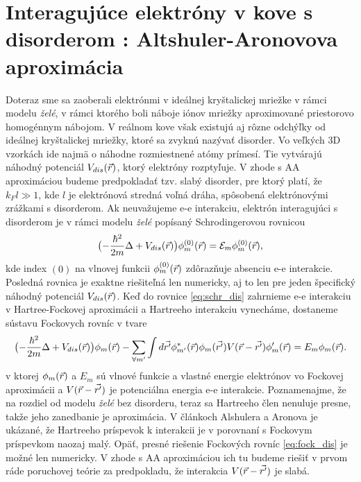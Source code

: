\section
{Interagujúce elektróny v kove s disorderom : Altshuler-Aronovova aproximácia}

 Doteraz sme sa zaoberali elektrónmi v ideálnej kryštalickej mriežke v rámci modelu {\it želé}, v rámci ktorého boli náboje iónov mriežky aproximované
 priestorovo homogénnym nábojom. V reálnom kove však existujú aj rôzne odchýľky od ideálnej kryštalickej mriežky, ktoré sa zvyknú nazývať disorder. Vo veľkých 3D vzorkách
 ide najmä o náhodne rozmiestnené atómy prímesí. Tie vytvárajú náhodný potenciál $V_{dis}(\vec{r})$, ktorý elektróny rozptyľuje. V zhode s AA aproximáciou budeme predpokladať tzv. slabý disorder, pre ktorý
 platí, že $k_F l \gg 1$, kde $l$ je elektrónová stredná voľná dráha, spôsobená elektrónovými zrážkami s disorderom.
Ak neuvažujeme e-e interakciu, elektrón interagujúci s disorderom je v rámci modelu {\it želé} popísaný Schrodingerovou rovnicou
\begin{equation}
\label{eq:schr_dis}
\bigl(-\frac{\hbar^2}{2m}\Delta + V_{dis}(\vec{r})\bigr)\phi_m^{(0)}(\vec{r})=\mathcal{E}_m\phi_m^{(0)}(\vec{r}) \text{,}
\end{equation}
kde index $(0)$ na vlnovej funkcii $\phi_m^{(0)}(\vec{r})$ zdôrazňuje absenciu e-e interakcie. Posledná rovnica je exaktne riešiteľná len numericky, aj to len pre jeden špecifický náhodný potenciál  $V_{dis}(\vec{r})$.
Keď do rovnice \eqref{eq:schr_dis} zahrnieme e-e interakciu v Hartree-Fockovej aproximácii a Hartreeho interakciu vynecháme, dostaneme sústavu Fockovych rovníc v tvare
\begin{equation}
 \label{eq:fock_dis}
 \bigl(-\frac{\hbar^2}{2m}\Delta + V_{dis}(\vec{r}) \bigr)\phi_m(\vec{r})-\sum_{\forall m'} \int d\vec{r'} \phi^*_{m'}(\vec{r})\phi_{m}(\vec{r'})V(\vec{r}-\vec{r'})\phi_m'(\vec{r})=E_m\phi_m(\vec{r}) \text{.}
\end{equation}
v ktorej $\phi_m(\vec{r})$ a $E_m$ sú vlnové funkcie a vlastné energie elektrónov vo Fockovej aproximácii a $V(\vec{r}-\vec{r'})$ je potenciálna energia e-e interakcie. Poznamenajme, že na rozdiel od modelu {\it želé} bez disorderu, teraz sa Hartreeho člen
nenuluje presne, takže jeho zanedbanie je aproximácia. V článkoch Alshulera a Aronova je ukázané, že Hartreeho príspevok k interakcii je v porovnaní s Fockovym príspevkom naozaj malý.
Opäť, presné riešenie Fockových rovníc \eqref{eq:fock_dis} je možné len numericky. V zhode s AA aproximáciou ich tu budeme riešiť v prvom ráde poruchovej teórie za predpokladu, že
interakcia $V(\vec{r}-\vec{r'})$ je slabá.

